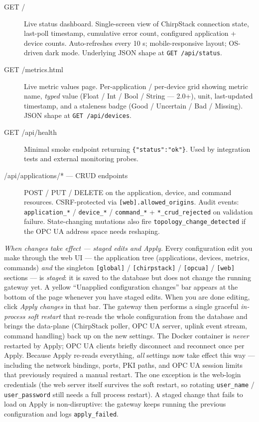 \begin{description}
\item[GET /]
Live status dashboard. Single-screen view of ChirpStack connection state, last-poll timestamp, cumulative error count, configured application + device counts. Auto-refreshes every 10 s; mobile-responsive layout; OS-driven dark mode. Underlying JSON shape at \texttt{GET\ /api/status}.
\item[GET /metrics.html]
Live metric values page. Per-application / per-device grid showing metric name, \emph{typed} value (Float / Int / Bool / String --- 2.0+), unit, last-updated timestamp, and a staleness badge (Good / Uncertain / Bad / Missing). JSON shape at \texttt{GET\ /api/devices}.
\item[GET /api/health]
Minimal smoke endpoint returning \texttt{\{"status":"ok"\}}. Used by integration tests and external monitoring probes.
\item[/api/applications/* --- CRUD endpoints]
POST / PUT / DELETE on the application, device, and command resources. CSRF-protected via \texttt{{[}web{]}.allowed\_origins}. Audit events: \texttt{application\_*} / \texttt{device\_*} / \texttt{command\_*} + \texttt{*\_crud\_rejected} on validation failure. State-changing mutations also fire \texttt{topology\_change\_detected} if the OPC UA address space needs reshaping.
\end{description}

\emph{When changes take effect --- staged edits and Apply.} Every configuration edit you make through the web UI --- the application tree (applications, devices, metrics, commands) \emph{and} the singleton \texttt{{[}global{]}} / \texttt{{[}chirpstack{]}} / \texttt{{[}opcua{]}} / \texttt{{[}web{]}} sections --- is \emph{staged}: it is saved to the database but does not change the running gateway yet. A yellow ``Unapplied configuration changes'' bar appears at the bottom of the page whenever you have staged edits. When you are done editing, click \emph{Apply changes} in that bar. The gateway then performs a single graceful \emph{in-process soft restart} that re-reads the whole configuration from the database and brings the data-plane (ChirpStack poller, OPC UA server, uplink event stream, command handling) back up on the new settings. The Docker container is \emph{never} restarted by Apply; OPC UA clients briefly disconnect and reconnect once per Apply. Because Apply re-reads everything, \emph{all} settings now take effect this way --- including the network bindings, ports, PKI paths, and OPC UA session limits that previously required a manual restart. The one exception is the web-login credentials (the web server itself survives the soft restart, so rotating \texttt{user\_name} / \texttt{user\_password} still needs a full process restart). A staged change that fails to load on Apply is non-disruptive: the gateway keeps running the previous configuration and logs \texttt{apply\_failed}.

